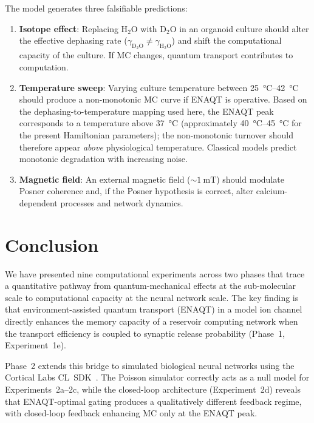 \documentclass[twocolumn,11pt]{article}
\begin{document}
The model generates three falsifiable predictions:

\begin{enumerate}
  \item \textbf{Isotope effect}: Replacing H$_2$O with D$_2$O
    in an organoid culture should alter the effective dephasing
    rate ($\gamma_{\mathrm{D_2O}} \neq \gamma_{\mathrm{H_2O}}$)
    and shift the computational capacity of the culture.
    If MC changes, quantum transport contributes to computation.
  \item \textbf{Temperature sweep}: Varying culture temperature
    between \SIrange{25}{42}{\celsius} should produce a
    non-monotonic MC curve if ENAQT is operative.
    Based on the dephasing-to-temperature mapping used here,
    the ENAQT peak corresponds to a temperature above
    \SI{37}{\celsius} (approximately \SIrange{40}{45}{\celsius}
    for the present Hamiltonian parameters); the non-monotonic
    turnover should therefore appear \emph{above} physiological
    temperature.
    Classical models predict monotonic degradation with
    increasing noise.
  \item \textbf{Magnetic field}: An external magnetic field
    (${\sim}\SI{1}{\milli\tesla}$) should modulate Posner
    coherence and, if the Posner hypothesis is correct, alter
    calcium-dependent processes and network dynamics.
\end{enumerate}

\section{Conclusion}
\label{sec:conclusion}

We have presented nine computational experiments across two
phases that trace a quantitative pathway from quantum-mechanical
effects at the sub-molecular scale to computational capacity at
the neural network scale.
The key finding is that environment-assisted quantum transport
(ENAQT) in a model ion channel directly enhances the memory
capacity of a reservoir computing network when the transport
efficiency is coupled to synaptic release probability
(Phase~1, Experiment~1e).

Phase~2 extends this bridge to simulated biological neural
networks using the Cortical Labs CL~SDK~\cite{CLSDK2024}.
The Poisson simulator correctly acts as a null model for
Experiments~2a--2c, while the closed-loop architecture
(Experiment~2d) reveals that ENAQT-optimal gating produces a
qualitatively different feedback regime, with closed-loop
feedback enhancing MC only at the ENAQT peak.
\end{document}

